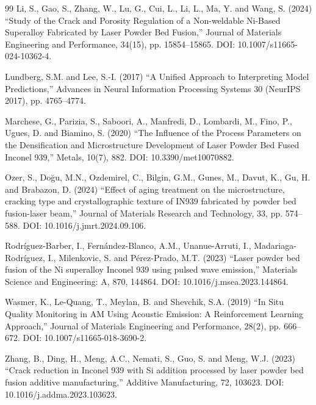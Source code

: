 \documentclass[a4paper]{article}
\begin{document}
\begin{thebibliography}{99}
Li, S., Gao, S., Zhang, W., Lu, G., Cui, L., Li, L., Ma, Y. and Wang, S. (2024) ``Study of the Crack and Porosity Regulation of a Non-weldable Ni-Based Superalloy Fabricated by Laser Powder Bed Fusion,'' Journal of Materials Engineering and Performance, 34(15), pp. 15854--15865. DOI: 10.1007/s11665-024-10362-4.

Lundberg, S.M. and Lee, S.-I. (2017) ``A Unified Approach to Interpreting Model Predictions,'' Advances in Neural Information Processing Systems 30 (NeurIPS 2017), pp. 4765--4774.

Marchese, G., Parizia, S., Saboori, A., Manfredi, D., Lombardi, M., Fino, P., Ugues, D. and Biamino, S. (2020) ``The Influence of the Process Parameters on the Densification and Microstructure Development of Laser Powder Bed Fused Inconel 939,'' Metals, 10(7), 882. DOI: 10.3390/met10070882.

Ozer, S., Doğu, M.N., Ozdemirel, C., Bilgin, G.M., Gunes, M., Davut, K., Gu, H. and Brabazon, D. (2024) ``Effect of aging treatment on the microstructure, cracking type and crystallographic texture of IN939 fabricated by powder bed fusion-laser beam,'' Journal of Materials Research and Technology, 33, pp. 574--588. DOI: 10.1016/j.jmrt.2024.09.106.

Rodríguez-Barber, I., Fernández-Blanco, A.M., Unanue-Arruti, I., Madariaga-Rodríguez, I., Milenkovic, S. and Pérez-Prado, M.T. (2023) ``Laser powder bed fusion of the Ni superalloy Inconel 939 using pulsed wave emission,'' Materials Science and Engineering: A, 870, 144864. DOI: 10.1016/j.msea.2023.144864.

Wasmer, K., Le-Quang, T., Meylan, B. and Shevchik, S.A. (2019) ``In Situ Quality Monitoring in AM Using Acoustic Emission: A Reinforcement Learning Approach,'' Journal of Materials Engineering and Performance, 28(2), pp. 666--672. DOI: 10.1007/s11665-018-3690-2.

Zhang, B., Ding, H., Meng, A.C., Nemati, S., Guo, S. and Meng, W.J. (2023) ``Crack reduction in Inconel 939 with Si addition processed by laser powder bed fusion additive manufacturing,'' Additive Manufacturing, 72, 103623. DOI: 10.1016/j.addma.2023.103623.

\end{thebibliography}
\end{document}
